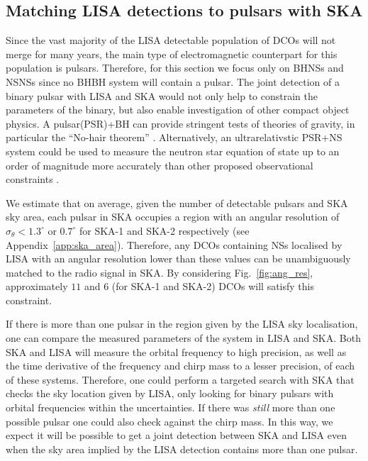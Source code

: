 \subsection{Matching LISA detections to pulsars with SKA}\label{sec:pulsar_matching}
Since the vast majority of the LISA detectable population of DCOs will not merge for many years, the main type of electromagnetic counterpart for this population is pulsars. Therefore, for this section we focus only on BHNSs and NSNSs since no BHBH system will contain a pulsar. The joint detection of a binary pulsar with LISA and SKA would not only help to constrain the parameters of the binary, but also enable investigation of other compact object physics. A pulsar(PSR)+BH can provide stringent tests of theories of gravity, in particular the ``No-hair theorem'' \citep{Keane+2015}. Alternatively, an ultrarelativstic PSR+NS system could be used to measure the neutron star equation of state up to an order of magnitude more accurately than other proposed observational constraints \citep{Kyutoku+2019, Thrane+2020}.

We estimate that on average, given the number of detectable pulsars and SKA sky area, each pulsar in SKA occupies a region with an angular resolution of $\sigma_{\theta} < 1.3^\circ$ or $0.7^\circ$ for SKA-1 and SKA-2 respectively (see Appendix~\ref{app:ska_area}). Therefore, any DCOs containing NSs localised by LISA with an angular resolution lower than these values can be unambiguously matched to the radio signal in SKA. By considering Fig.~\ref{fig:ang_res}, approximately $11$ and $6$ (for SKA-1 and SKA-2) DCOs will satisfy this constraint.

If there is more than one pulsar in the region given by the LISA sky localisation, one can compare the measured parameters of the system in LISA and SKA. Both SKA and LISA will measure the orbital frequency to high precision, as well as the time derivative of the frequency and chirp mass to a lesser precision, of each of these systems. Therefore, one could perform a targeted search with SKA that checks the sky location given by LISA, only looking for binary pulsars with orbital frequencies within the uncertainties. If there was \textit{still} more than one possible pulsar one could also check against the chirp mass. In this way, we expect it will be possible to get a joint detection between SKA and LISA even when the sky area implied by the LISA detection contains more than one pulsar.

